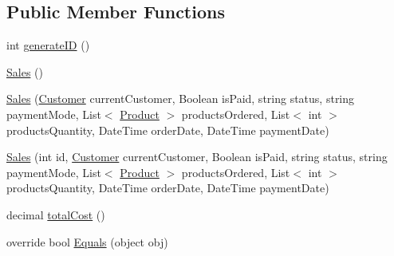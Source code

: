 \subsection*{Public Member Functions}
\begin{DoxyCompactItemize}
\item 
int \hyperlink{class_health___assignment_1_1_sales_a6a20a2d589f2d1b41bb11a935910af7e}{generate\+ID} ()
\item 
\hyperlink{class_health___assignment_1_1_sales_adb0acbfa3b27fe020dd10590008d28f7}{Sales} ()
\item 
\hyperlink{class_health___assignment_1_1_sales_accb6abdf20104662a4b91c81e0e198c4}{Sales} (\hyperlink{class_health___assignment_1_1_customer}{Customer} current\+Customer, Boolean is\+Paid, string status, string payment\+Mode, List$<$ \hyperlink{class_health___assignment_1_1_product}{Product} $>$ products\+Ordered, List$<$ int $>$ products\+Quantity, Date\+Time order\+Date, Date\+Time payment\+Date)
\item 
\hyperlink{class_health___assignment_1_1_sales_adc0cc4e815eca662714b7dfae8c35084}{Sales} (int id, \hyperlink{class_health___assignment_1_1_customer}{Customer} current\+Customer, Boolean is\+Paid, string status, string payment\+Mode, List$<$ \hyperlink{class_health___assignment_1_1_product}{Product} $>$ products\+Ordered, List$<$ int $>$ products\+Quantity, Date\+Time order\+Date, Date\+Time payment\+Date)
\item 
decimal \hyperlink{class_health___assignment_1_1_sales_aee225f19f1ad9603c2db0aebeec612c4}{total\+Cost} ()
\item 
override bool \hyperlink{class_health___assignment_1_1_sales_aa1c187315eded971605959f6930d839c}{Equals} (object obj)
\end{DoxyCompactItemize}
